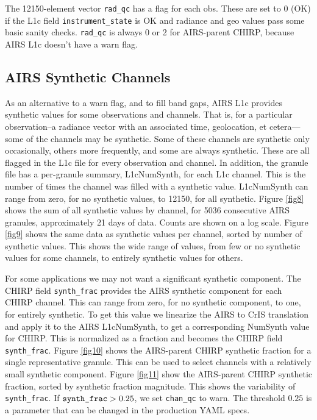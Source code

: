 \documentclass[12pt]{article}
\begin{document}
The 12150-element vector \texttt{rad\_qc} has a flag for each obs.
These are set to 0 (OK) if the L1c field \texttt{instrument\_state}
is OK and radiance and geo values pass some basic sanity checks.
\texttt{rad\_qc} is always 0 or 2 for AIRS-parent CHIRP, because
AIRS L1c doesn't have a warn flag.

\subsection{AIRS Synthetic Channels}

As an alternative to a warn flag, and to fill band gaps, AIRS L1c
provides synthetic values for some observations and channels.  That
is, for a particular observation--a radiance vector with an
associated time, geolocation, et cetera---some of the channels may
be synthetic.  Some of these channels are synthetic only
occasionally, others more frequently, and some are always synthetic.
These are all flagged in the L1c file for every observation and
channel.  In addition, the granule file has a per-granule summary,
L1cNumSynth, for each L1c channel.  This is the number of times the
channel was filled with a synthetic value.  L1cNumSynth can range
from zero, for no synthetic values, to 12150, for all synthetic.
Figure \ref{fig8} shows the sum of all synthetic values by channel,
for 5036 consecutive AIRS granules, approximately 21 days of data.
Counts are shown on a log scale.  Figure \ref{fig9} shows the same
data as synthetic values per channel, sorted by number of synthetic
values.  This shows the wide range of values, from few or no
synthetic values for some channels, to entirely synthetic values for
others.

For some applications we may not want a significant synthetic
component.  The CHIRP field \texttt{synth\_frac} provides the AIRS
synthetic component for each CHIRP channel.  This can range from
zero, for no synthetic component, to one, for entirely synthetic.
To get this value we linearize the AIRS to CrIS translation and
apply it to the AIRS L1cNumSynth, to get a corresponding NumSynth
value for CHIRP.  This is normalized as a fraction and becomes the
CHIRP field \texttt{synth\_frac}.  Figure \ref{fig10} shows the
AIRS-parent CHIRP synthetic fraction for a single representative
granule. This can be used to select channels with a relatively small
synthetic component.  Figure \ref{fig11} show the AIRS-parent CHIRP
synthetic fraction, sorted by synthetic fraction magnitude.  This
shows the variability of \texttt{synth\_frac}.  If
$\hbox{\texttt{synth\_frac}} > 0.25$, we set \texttt{chan\_qc} to
warn.  The threshold $0.25$ is a parameter that can be changed in
the production YAML specs.
\end{document}
